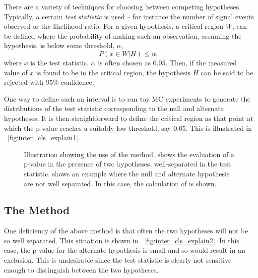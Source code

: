 There are a variety of techniques for choosing between competing
hypotheses. Typically, a certain \emph{test statistic} is used -- for instance the
number of signal events observed or the likelihood ratio. For a given
hypothesis, a critical region $W$, can be defined where the probability of
making such an observation, assuming the hypothesis, is below some threshold,
$\alpha$,
\begin{equation*}
P\left(x \in W|H\right) \leq \alpha,
\end{equation*}
where $x$ is the test statistic. $\alpha$ is often chosen as 0.05. Then, if the
measured value of $x$ is found to be in the critical region, the hypothesis $H$
can be said to be rejected with 95\% confidence.

One way to define such an interval is to run toy \ac{MC} experiments to
generate the distributions of the test statistic corresponding to the null and
alternate hypotheses. It is then straightforward to define the critical region
as that point at which the p-value reaches a suitably low threshold, say
$0.05$. This is illustrated in \fig~\ref{fig:inter_cls_explain1}.

\begin{figure}
\centering
{}
\caption[Illustration showing the use of the \CLs method]{Illustration showing
  the use of the \CLs method.  shows the
  evaluation of a p-value in the presence of two hypotheses, well-separated in
  the test statistic.  shows an example where the
  null and alternate hypothesis are not well separated. In this case, the
  calculation of \CLs is shown.}
\label{fig:inter_cls_explain}
\end{figure}

\subsection[The \CLs Method]{The \boldmath{\CLs} Method}
One deficiency of the above method is that often the two hypotheses will not be
so well separated. This situation is shown in
\fig~\ref{fig:inter_cls_explain2}. In this case, the p-value for the alternate
hypothesis is small and so would result in an exclusion. This is undesirable
since the test statistic is clearly not sensitive enough to distinguish between
the two hypotheses.


